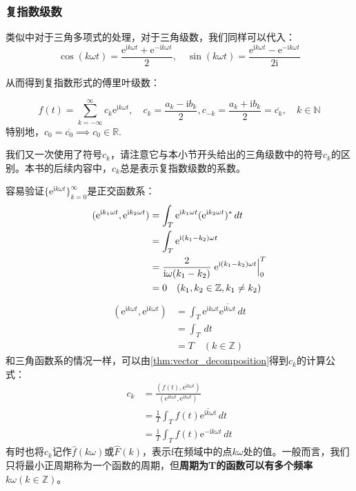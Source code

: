 \subsubsection{复指数级数}

类似中对于三角多项式的处理，对于三角级数，我们同样可以代入：
\[\cos(k\omega t)=\frac{\mathrm{e}^{\mathrm{i}k\omega t}+\mathrm{e}^{-\mathrm{i}k\omega t}}{2},\quad \sin(k\omega t)=\frac{\mathrm{e}^{\mathrm{i}k\omega t}-\mathrm{e}^{-\mathrm{i}k\omega t}}{2\mathrm{i}}\]

从而得到复指数形式的傅里叶级数：

\begin{definition}[复指数形式傅里叶展开]
    \[f(t)=\sum_{k = -\infty}^{\infty}  c_k \mathrm{e}^{\mathrm{i}k\omega t} ,\quad c_k=\frac{a_k-\mathrm{i}b_k}{2},c_{-k}=\frac{a_k+\mathrm{i}b_k}{2}=\overline{c_k},\quad k\in \mathbb{N}\]
特别地，$c_0=\overline{c_0}\implies c_0\in\mathbb{R} $.
\end{definition}
我们又一次使用了符号$c_k$，请注意它与本小节开头给出的三角级数中的符号$c_k$的区别。本书的后续内容中，$c_k$总是表示复指数级数的系数。

容易验证$\{\mathrm{e}^{\mathrm{i}k\omega t}\}_{k=0}^{\infty}$是正交函数系：
\begin{align*}
    (\mathrm{e}^{\mathrm{i}k_1\omega t},\mathrm{e}^{\mathrm{i}k_2\omega t})&=\int_{T}\mathrm{e}^{\mathrm{i}k_1\omega t}(\mathrm{e}^{\mathrm{i}k_2\omega t})^*\,dt\\
    &=\int_{T}\mathrm{e}^{\mathrm{i}(k_1-k_2)\omega t}\\
    &=\frac{2}{\mathrm{i}\omega (k_1-k_2)}\left.\mathrm{e}^{\mathrm{i}(k_1-k_2)\omega t}\right|_{0}^{T}\\
    &=0\quad (k_1,k_2\in \mathbb{Z},k_1\neq k_2)
\end{align*}
\begin{align*}
    (\mathrm{e}^{\mathrm{i}k\omega t},\mathrm{e}^{\mathrm{i}k\omega t})&=\int_{T}\mathrm{e}^{\mathrm{i}k\omega t}\overline{\mathrm{e}^{\mathrm{i}k\omega t}}\,dt\\
    &=\int_{T}\,dt\\
    &=T\quad (k\in \mathbb{Z} )
\end{align*}
和三角函数系的情况一样，可以由\cref{thm:vector_decomposition}得到$c_k$的计算公式：
\begin{align*}
    c_k & =\frac{(f(t),\mathrm{e}^{\mathrm{i}k\omega t})}{(\mathrm{e}^{\mathrm{i}k\omega t},\mathrm{e}^{\mathrm{i}k\omega t})} \\
        & =\frac{1}{T}\int_{T}f(t)\overline{\mathrm{e}^{\mathrm{i}k\omega t}}\,dt                 \\
        & =\frac{1}{T}\int_{T}f(t)\mathrm{e}^{-\mathrm{i}k\omega t}\,dt
\end{align*}
有时也将$c_k$记作$\hat{f}(k\omega)$或$\hat{F}(k)$，表示f在频域中的点$k\omega$处的值。一般而言，我们只将最小正周期称为一个函数的周期，但\textbf{周期为T的函数可以有多个频率$k\omega(k \in \mathbb{Z})$}。

